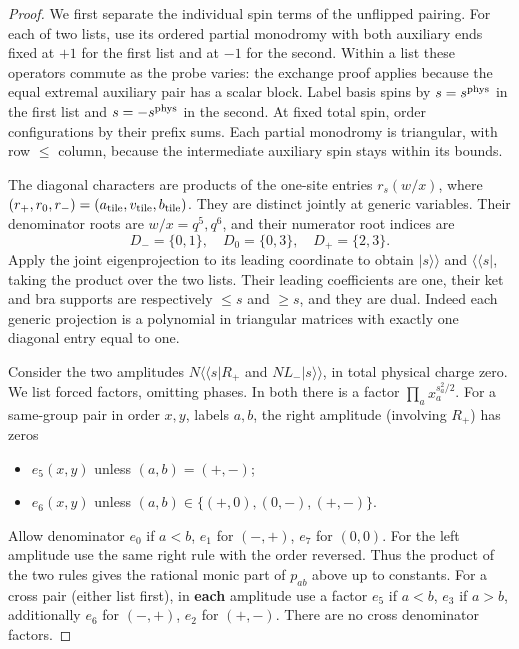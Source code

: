 \begin{proof}
We first separate the individual spin terms of the unflipped pairing.
For each of two lists, use its ordered partial monodromy with both
auxiliary ends fixed at $+1$ for the first list and at $-1$ for the
second. Within a list these operators commute as the probe varies:
the exchange proof applies because the equal extremal auxiliary pair
has a scalar block. Label basis spins by $s=s^{\rm phys}$ in the
first list and $s=-s^{\rm phys}$ in the second. At fixed total spin,
order configurations by their prefix sums. Each partial monodromy is
triangular, with row $\le$ column, because the intermediate auxiliary
spin stays within its bounds.

The diagonal characters are products of the one-site entries
$r_s(w/x)$, where
$(r_+,r_0,r_-)=(a_{\rm tile},v_{\rm tile},b_{\rm tile})$.
They are distinct jointly at generic variables. Their denominator
roots are $w/x=q^5,q^6$, and their numerator root indices are
\[
D_-=\{0,1\},\quad D_0=\{0,3\},\quad D_+=\{2,3\}.
\]
Apply the joint eigenprojection to its leading coordinate to obtain
$|s\rangle\rangle$ and $\langle\langle s|$, taking the product over
the two lists. Their leading coefficients are one, their ket and bra
supports are respectively $\le s$ and $\ge s$, and they are dual.
Indeed each generic projection is a polynomial in triangular matrices
with exactly one diagonal entry equal to one.

Consider the two amplitudes $N\langle\langle s|R_+$ and $N L_- |s\rangle\rangle$, in total physical charge zero. We list forced factors, omitting phases. In both there is a factor $\prod_a x_a^{s_a^2/2}$. For a same-group pair in order $x,y$, labels $a,b$, the right amplitude (involving $R_+$) has zeros
\begin{itemize}
\item $e_5(x,y)$ unless $(a,b)=(+,-)$;
\item $e_6(x,y)$ unless $(a,b)\in\{(+,0),(0,-),(+,-)\}$.

\end{itemize}
Allow denominator $e_0$ if $a<b$, $e_1$ for $(-,+)$, $e_7$ for $(0,0)$. For the left amplitude use the same right rule with the order reversed. Thus the product of the two rules gives the rational monic part of $p_{ab}$ above up to constants. For a cross pair (either list first), in \textbf{each} amplitude use a factor $e_5$ if $a<b$, $e_3$ if $a>b$, additionally $e_6$ for $(-,+)$, $e_2$ for $(+,-)$. There are no cross denominator factors.


\end{proof}
